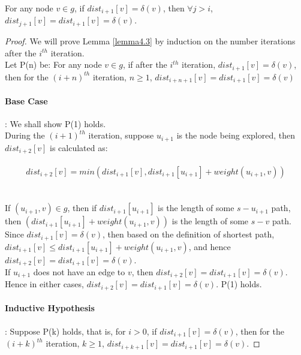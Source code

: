 \begin{sublemma} \label{lemma4.3}
For any node $v \in g$, if $dist_{i+1}[v] = \delta(v)$, then $\forall j > i$, $dist_{j+1}[v] = dist_{i+1}[v] = \delta(v)$. 
\end{sublemma}
\begin{proof}
We will prove Lemma \ref{lemma4.3} by induction on the number iterations after the $i^{th}$ iteration. 
\\
Let P(n) be: For any node $v \in g$, if after the $i^{th}$ iteration, $dist_{i+1}[v] = \delta(v)$, then for the $(i+n)^{th}$ iteration, $n \geq 1$, $dist_{i+n+1}[v] = dist_{i+1}[v] = \delta(v)$

\paragraph*{Base Case}: We shall show P(1) holds. 
\\
During the $(i+1)^{th}$ iteration, suppose $u_{i+1}$ is the node being explored, then $dist_{i+2}[v]$ is calculated as: 
\\\\
\tab\[
        dist_{i+2}[v] = min(dist_{i+1}[v], dist_{i+1}[u_{i+1}] + weight(u_{i+1}, v))
      \]
\\\\
If $(u_{i+1}, v) \in g $, then if $dist_{i+1}[u_{i+1}]$ is the length of some $s-u_{i+1}$ path, then $(dist_{i+1}[u_{i+1}] + weight(u_{i+1}, v))$ is the length of some $s-v$ path. Since $dist_{i+1}[v] = \delta(v)$, then based on the definition of shortest path, $dist_{i+1}[v] \leq dist_{i+1}[u_{i+1}] + weight(u_{i+1}, v)$, and hence $dist_{i+2}[v] = dist_{i+1}[v] = \delta(v)$. 
\\
If $u_{i+1}$ does not have an edge to $v$, then $dist_{i+2}[v] = dist_{i+1}[v] = \delta(v)$. 
\\
Hence in either cases, $dist_{i+2}[v] = dist_{i+1}[v] = \delta(v)$. P(1) holds. 


\paragraph*{Inductive Hypothesis}: Suppose P(k) holds, that is, for $i > 0$, if $dist_{i+1}[v] = \delta(v)$, then for the $(i+k)^{th}$ iteration, $k \geq 1$, $dist_{i+k+1}[v] = dist_{i+1}[v] = \delta(v)$. 



\end{proof}
